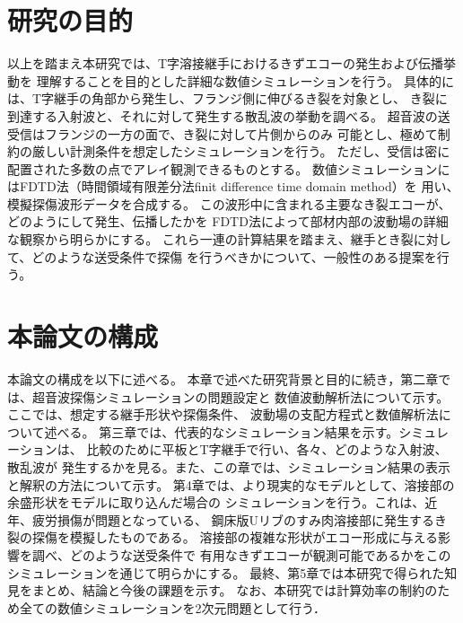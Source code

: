 \section{研究の目的}
以上を踏まえ本研究では、T字溶接継手におけるきずエコーの発生および伝播挙動を
理解することを目的とした詳細な数値シミュレーションを行う。
具体的には、T字継手の角部から発生し、フランジ側に伸びるき裂を対象とし、
き裂に到達する入射波と、それに対して発生する散乱波の挙動を調べる。
超音波の送受信はフランジの一方の面で、き裂に対して片側からのみ
可能とし、極めて制約の厳しい計測条件を想定したシミュレーションを行う。
ただし、受信は密に配置された多数の点でアレイ観測できるものとする。
数値シミュレーションにはFDTD法（時間領域有限差分法finit difference time domain method）を
用い、模擬探傷波形データを合成する。
この波形中に含まれる主要なき裂エコーが、どのようにして発生、伝播したかを
FDTD法によって部材内部の波動場の詳細な観察から明らかにする。
これら一連の計算結果を踏まえ、継手とき裂に対して、どのような送受条件で探傷
を行うべきかについて、一般性のある提案を行う。
\section{本論文の構成}
本論文の構成を以下に述べる。
本章で述べた研究背景と目的に続き，第二章では、超音波探傷シミュレーションの問題設定と
数値波動解析法について示す。ここでは、想定する継手形状や探傷条件、
波動場の支配方程式と数値解析法について述べる。
第三章では、代表的なシミュレーション結果を示す。シミュレーションは、
比較のために平板とT字継手で行い、各々、どのような入射波、散乱波が
発生するかを見る。また、この章では、シミュレーション結果の表示と解釈の方法について示す。
第4章では、より現実的なモデルとして、溶接部の余盛形状をモデルに取り込んだ場合の
シミュレーションを行う。これは、近年、疲労損傷が問題となっている、
鋼床版Uリブのすみ肉溶接部に発生するき裂の探傷を模擬したものである。
溶接部の複雑な形状がエコー形成に与える影響を調べ、どのような送受条件で
有用なきずエコーが観測可能であるかをこのシミュレーションを通じて明らかにする。
最終、第5章では本研究で得られた知見をまとめ、結論と今後の課題を示す。
なお、本研究では計算効率の制約のため全ての数値シミュレーションを2次元問題として行う．

